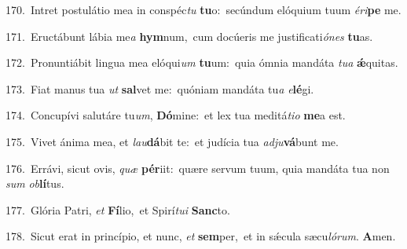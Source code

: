 {\numbfont\textcolor{\numbcolor}{170.}}~Intret postulátio mea in conspéc\textit{tu} \textbf{tu}\-o:~\star secúndum elóquium tuum \textit{é}\-\textit{ri}\textbf{pe} me.\par
{\numbfont\textcolor{\numbcolor}{171.}}~Eructábunt lábia me\textit{a} \textbf{hym}\-num,~\star cum docúeris me justificati\-\textit{ó}\-\textit{nes} \textbf{tu}\-as.\par
{\numbfont\textcolor{\numbcolor}{172.}}~Pronuntiábit lingua mea elóqui\textit{um} \textbf{tu}\-um:~\star quia ómnia mandáta \textit{tu}\-\textit{a} \textbf{ǽ}\-quitas.\par
{\numbfont\textcolor{\numbcolor}{173.}}~Fiat manus tua \textit{ut} \textbf{sal}\-vet me:~\star quóniam mandáta tu\textit{a} \textit{e}\-\textbf{lé}gi.\par
{\numbfont\textcolor{\numbcolor}{174.}}~Concupívi salutáre tu\-\textit{um}\-, \textbf{Dó}\-mine:~\star et lex tua meditá\-\textit{ti}\-\textit{o} \textbf{me}\-a est.\par
{\numbfont\textcolor{\numbcolor}{175.}}~Vivet ánima mea, et \textit{lau}\-\textbf{dá}bit te:~\star et judícia tua \textit{ad}\-\textit{ju}\textbf{vá}bunt me.\par
{\numbfont\textcolor{\numbcolor}{176.}}~Errávi, sicut ovis, \textit{quæ} \textbf{pér}\-iit:~\star quære servum tuum, quia mandáta tua non \textit{sum} \textit{ob}\-\textbf{lí}tus.\par
{\numbfont\textcolor{\numbcolor}{177.}}~Glória Patri, \textit{et} \textbf{Fí}\-lio,~\star et Spirí\-\textit{tu}\-\textit{i} \textbf{Sanc}\-to.\par
{\numbfont\textcolor{\numbcolor}{178.}}~Sicut erat in princípio, et nunc, \textit{et} \textbf{sem}\-per,~\star et in sǽcula sæcu\-\textit{ló}\-\textit{rum}. \textbf{A}\-men.\par
